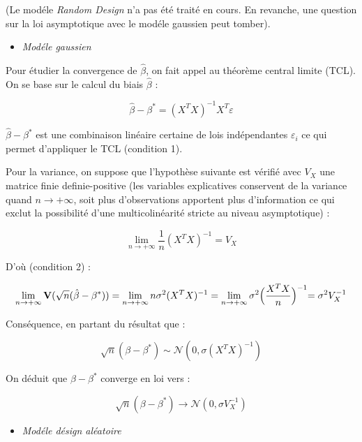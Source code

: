 \bigskip

(Le mod\'ele \textit{Random Design} n'a pas \'et\'e trait\'e en cours. En revanche, une question sur la loi asymptotique avec le mod\'ele gaussien peut tomber).

\bigskip

\begin{itemize} 
	\item \textit{Mod\'ele gaussien}
\end{itemize}

Pour \'etudier la convergence de $\hat \beta$, on fait appel au th\'eor\`eme central limite (TCL). On se base sur le calcul du biais $\hat \beta$ :

$$ \hat \beta - \beta^{*} = (X^T X)^{-1} X^T \varepsilon $$

$\hat \beta - \beta^{*}$ est une combinaison lin\'eaire certaine de lois ind\'ependantes $\varepsilon_i$ ce qui permet d'appliquer le TCL (condition 1).

\bigskip

Pour la variance, on suppose que l'hypoth\`ese suivante est v\'erifi\'e avec $V_X$ une matrice finie definie-positive (les variables explicatives conservent de la variance quand $n \rightarrow +\infty$, soit plus d'observations apportent plus d'information ce qui exclut la possibilit\'e d'une multicolin\'earit\'e stricte au niveau asymptotique) :

$$ \lim_{n\rightarrow +\infty} \frac{1}{n}(X^T X)^{-1} = V_X $$

D'où (condition 2) :

$$ \lim_{n\rightarrow +\infty} \mathbf{V}(\sqrt{n} (\hat \beta - \beta^{*})) = \lim_{n\rightarrow +\infty} n \sigma^2 (X^T X)^{-1} = \lim_{n\rightarrow +\infty} \sigma^2 \Bigl(\frac{X^T X}{n}\Bigl)^{-1} = \sigma^2 V_X^{-1} $$

\bigskip

Cons\'equence, en partant du r\'esultat que :

$$ \sqrt{n} (\beta - \beta^{*}) \sim \mathcal{N}(0, \sigma (X^T X)^{-1} ) $$

\bigskip

On d\'eduit que $\beta - \beta^{*}$ converge en loi vers :

$$ \sqrt{n} (\beta - \beta^{*}) \rightarrow  \mathcal{N}(0, \sigma V_X^{-1} )$$

\bigskip

\begin{itemize} 
	\item \textit{Mod\'ele d\'esign al\'eatoire}
\end{itemize}

